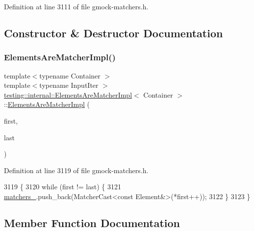 Definition at line 3111 of file gmock-\/matchers.\+h.



\subsection{Constructor \& Destructor Documentation}
\mbox{\label{classtesting_1_1internal_1_1ElementsAreMatcherImpl_abfe21bd90e0c085d4a171e22f1e2cc09}} 
\subsubsection{\texorpdfstring{Elements\+Are\+Matcher\+Impl()}{ElementsAreMatcherImpl()}}
{\footnotesize\ttfamily template$<$typename Container $>$ \\
template$<$typename Input\+Iter $>$ \\
\hyperlink{classtesting_1_1internal_1_1ElementsAreMatcherImpl}{testing\+::internal\+::\+Elements\+Are\+Matcher\+Impl}$<$ Container $>$\+::\hyperlink{classtesting_1_1internal_1_1ElementsAreMatcherImpl}{Elements\+Are\+Matcher\+Impl} (\begin{DoxyParamCaption}\item[{Input\+Iter}]{first,  }\item[{Input\+Iter}]{last }\end{DoxyParamCaption})\hspace{0.3cm}{\ttfamily [inline]}}



Definition at line 3119 of file gmock-\/matchers.\+h.


\begin{DoxyCode}
3119                                                           \{
3120     \textcolor{keywordflow}{while} (first != last) \{
3121       \hyperlink{classtesting_1_1internal_1_1ElementsAreMatcherImpl_aefcf41a7cfe74274c68272a67fb94e9f}{matchers\_}.push\_back(MatcherCast<const Element&>(*first++));
3122     \}
3123   \}
\end{DoxyCode}


\subsection{Member Function Documentation}
\mbox{\label{classtesting_1_1internal_1_1ElementsAreMatcherImpl_a8a8cf605a9fdc0eb8855fe9ce1aafb1e}} 
